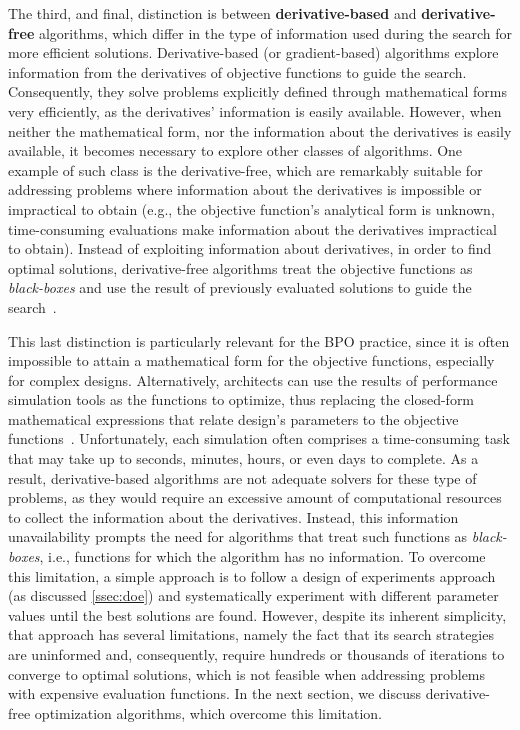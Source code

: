 	The third, and final, distinction is between \textbf{derivative-based} and \textbf{derivative-free} algorithms, which differ in the type of information used during the search for more efficient solutions. Derivative-based (or gradient-based) algorithms explore information from the derivatives of objective functions to guide the search. Consequently, they solve problems explicitly defined through mathematical forms very efficiently, as the derivatives' information is easily available. However, when neither the mathematical form, nor the information about the derivatives is easily available, it becomes necessary to explore other classes of algorithms. One example of such class is the derivative-free, which are remarkably suitable for addressing problems where information about the derivatives is impossible or impractical to obtain (e.g., the objective function's analytical form is unknown, time-consuming evaluations make information about the derivatives impractical to obtain). Instead of exploiting information about derivatives, in order to find optimal solutions, derivative-free algorithms treat the objective functions as \textit{black-boxes} and use the result of previously evaluated solutions to guide the search~\cite{Rios2013}.
	
	This last distinction is particularly relevant for the \ac{BPO} practice, since it is often impossible to attain a mathematical form for the objective functions, especially for complex designs. Alternatively, architects can use the results of performance simulation tools as the functions to optimize, thus replacing the closed-form mathematical expressions that relate design's parameters to the objective functions~\cite{Wortmann2016BBO}. Unfortunately, each simulation often comprises a time-consuming task that may take up to seconds, minutes, hours, or even days to complete. As a result, derivative-based algorithms are not adequate solvers for these type of problems, as they would require an excessive amount of computational resources to collect the information about the derivatives. Instead, this information unavailability prompts the need for algorithms that treat such functions as \textit{black-boxes}, i.e., functions for which the algorithm has no information. To overcome this limitation, a simple approach is to follow a design of experiments approach (as discussed \cref{ssec:doe}) and systematically experiment with different parameter values until the best solutions are found. However, despite its inherent simplicity, that approach has several limitations, namely the fact that its search strategies are uninformed and, consequently, require hundreds or thousands of iterations to converge to optimal solutions, which is not feasible when addressing problems with expensive evaluation functions. In the next section, we discuss derivative-free optimization algorithms, which overcome this limitation.
	
